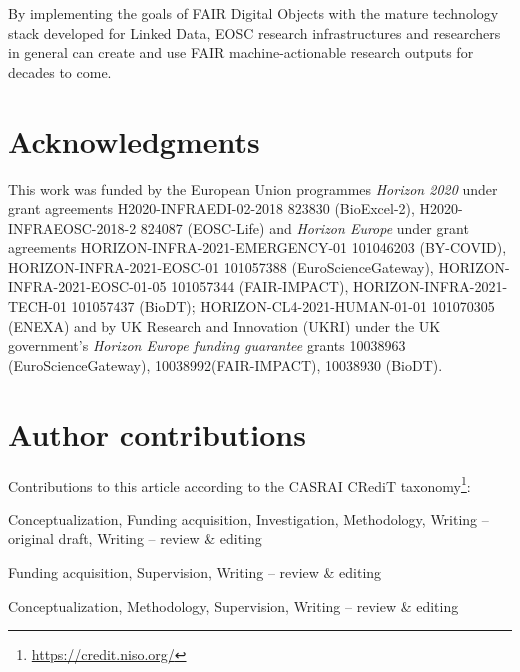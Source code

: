 \documentclass[fleqn,10pt,NOlineno]{wlpeerjlua}
\providecommand{\tightlist}{%
  \setlength{\itemsep}{0pt}\setlength{\parskip}{0pt}}
\begin{document}
By implementing the goals of FAIR Digital Objects with the mature technology stack developed for Linked Data, EOSC research infrastructures and researchers in general can create and use FAIR machine-actionable research outputs for decades to come.

\section*{Acknowledgments}

\begin{small}
This work was funded by the European Union programmes \emph{Horizon 2020} under grant agreements H2020-INFRAEDI-02-2018 823830 (BioExcel-2), H2020-INFRAEOSC-2018-2 824087 (EOSC-Life) and \emph{Horizon Europe} under grant agreements HORIZON-INFRA-2021-EMERGENCY-01 101046203 (BY-COVID), HORIZON-INFRA-2021-EOSC-01 101057388 (EuroScienceGateway), HORIZON-INFRA-2021-EOSC-01-05 101057344 (FAIR-IMPACT), HORIZON-INFRA-2021-TECH-01 101057437 (BioDT);  HORIZON-CL4-2021-HUMAN-01-01 101070305 (ENEXA)  and by UK Research and Innovation (UKRI) under the UK government’s \emph{Horizon Europe funding guarantee} grants 10038963 (EuroScienceGateway), 10038992(FAIR-IMPACT), 10038930 (BioDT).
\end{small}

\section*{Author contributions}
\begin{small}

Contributions to this article according to the CASRAI CRediT taxonomy\footnote{\url{https://credit.niso.org/}}:

\begin{description}
\tightlist
\item[Stian Soiland-Reyes]
Conceptualization, Funding acquisition, Investigation, Methodology,
Writing -- original draft, Writing -- review \& editing
\item[Carole Goble]
Funding acquisition, Supervision, Writing -- review \& editing
\item[Paul Groth]
Conceptualization, Methodology, Supervision, Writing -- review \& editing
\end{description}
\end{small}


%
\def\UrlFont{\small}

\printbibliography

\printshorthands[heading=fdobibliography]


\end{document}
